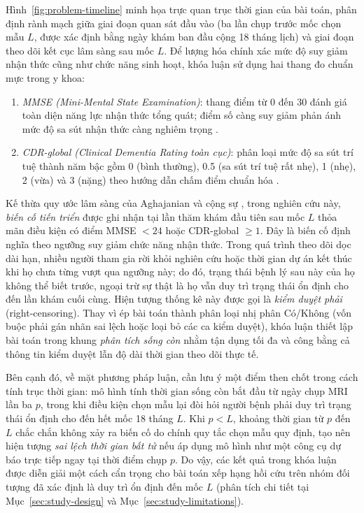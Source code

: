Hình~\ref{fig:problem-timeline} minh họa trực quan trục thời gian của bài toán, phân định rành mạch giữa giai đoạn quan sát đầu vào (ba lần chụp trước mốc chọn mẫu $L$, được xác định bằng ngày khám ban đầu cộng 18 tháng lịch) và giai đoạn theo dõi kết cục lâm sàng sau mốc $L$. Để lượng hóa chính xác mức độ suy giảm nhận thức cũng như chức năng sinh hoạt, khóa luận sử dụng hai thang đo chuẩn mực trong y khoa:
\begin{enumerate}
\item \emph{MMSE (Mini-Mental State Examination)}: thang điểm từ 0 đến 30 đánh giá toàn diện năng lực nhận thức tổng quát; điểm số càng suy giảm phản ánh mức độ sa sút nhận thức càng nghiêm trọng \cite{folstein1975mmse}.
\item \emph{CDR-global (Clinical Dementia Rating toàn cục)}: phân loại mức độ sa sút trí tuệ thành năm bậc gồm 0 (bình thường), 0.5 (sa sút trí tuệ rất nhẹ), 1 (nhẹ), 2 (vừa) và 3 (nặng) theo hướng dẫn chấm điểm chuẩn hóa \cite{morris1993cdr,knightcdrscoring}.
\end{enumerate}

Kế thừa quy ước lâm sàng của Aghajanian và cộng sự \cite{aghajanian2025longitudinal}, trong nghiên cứu này, \emph{biến cố tiến triển} được ghi nhận tại lần thăm khám đầu tiên sau mốc $L$ thỏa mãn điều kiện có điểm MMSE $<24$ hoặc CDR-global $\geq1$. Đây là biến cố định nghĩa theo ngưỡng suy giảm chức năng nhận thức. Trong quá trình theo dõi dọc dài hạn, nhiều người tham gia rời khỏi nghiên cứu hoặc thời gian dự án kết thúc khi họ chưa từng vượt qua ngưỡng này; do đó, trạng thái bệnh lý sau này của họ không thể biết trước, ngoại trừ sự thật là họ vẫn duy trì trạng thái ổn định cho đến lần khám cuối cùng. Hiện tượng thống kê này được gọi là \emph{kiểm duyệt phải} (right-censoring). Thay vì ép bài toán thành phân loại nhị phân Có/Không (vốn buộc phải gán nhãn sai lệch hoặc loại bỏ các ca kiểm duyệt), khóa luận thiết lập bài toán trong khung \emph{phân tích sống còn} nhằm tận dụng tối đa và công bằng cả thông tin kiểm duyệt lẫn độ dài thời gian theo dõi thực tế.

Bên cạnh đó, về mặt phương pháp luận, cần lưu ý một điểm then chốt trong cách tính trục thời gian: mô hình tính thời gian sống còn bắt đầu từ ngày chụp MRI lần ba $p$, trong khi điều kiện chọn mẫu lại đòi hỏi người bệnh phải duy trì trạng thái ổn định cho đến hết mốc 18 tháng $L$. Khi $p<L$, khoảng thời gian từ $p$ đến $L$ chắc chắn không xảy ra biến cố do chính quy tắc chọn mẫu quy định, tạo nên hiện tượng \emph{sai lệch thời gian bất tử} \cite{suissa2008immortal} nếu áp dụng mô hình như một công cụ dự báo trực tiếp ngay tại thời điểm chụp $p$. Do vậy, các kết quả trong khóa luận được diễn giải một cách cẩn trọng cho bài toán xếp hạng hồi cứu trên nhóm đối tượng đã xác định là duy trì ổn định đến mốc $L$ (phân tích chi tiết tại Mục~\ref{sec:study-design} và Mục~\ref{sec:study-limitations}).

